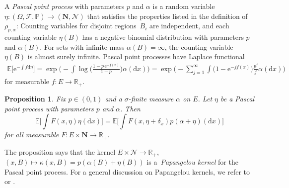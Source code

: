 \documentclass[pdftex]{sigma}
\numberwithin{equation}{section}
\newtheorem{Proposition}[Theorem]{Proposition}
 { \theoremstyle{definition}
\newtheorem{Definition}[Theorem]{Definition}
\newtheorem{Example}[Theorem]{Example}
\newtheorem{Remark}[Theorem]{Remark}
}
\newcommand{\e}{\mathrm{e}} %
\newcommand{\R}{\mathbb{R}}
\renewcommand{\P}{\mathbb{P}}
\newcommand{\E}{\mathbb{E}}
\newcommand{\dd}{\mathrm{d}} %
\newcommand{\1}{\mathbbm{1}}
\begin{document}
A \emph{Pascal point process} with parameters $p$ and $\alpha$ is a random variable $\eta\colon(\Omega,\mathcal F, \P)\to (\mathbf N,\mathcal N)$ that satisfies the properties listed in the definition of $\rho_{p,\alpha}$: Counting variables for disjoint regions~$B_i$ are independent, and each counting variable $\eta(B)$ has a negative binomial distribution with parameters $p$ and $\alpha(B)$. For sets with infinite mass $\alpha(B) = \infty$, the counting variable $\eta(B)$ is almost surely infinite. Pascal point processes have Laplace functional
\begin{gather*}
	\E\bigl[ \e^{-\int f\dd \eta}\bigr] = \exp \biggl(\! - \int \log \biggl(\frac{1- p\,\e^{-f(x)}}{1- p}\biggr) \alpha (\dd x)\biggr) = 	\exp\Biggl(\! - \sum_{j=1}^\infty \int \bigl(1- \e^{- j f(x)}\bigr) \frac{p^j}{j} \alpha(\dd x) \Biggr)
\end{gather*}
for measurable $f \colon E \to \R_+$.

\begin{Proposition}%
	Fix $p\in (0,1)$ and a $\sigma$-finite measure $\alpha$ on $E$. Let $\eta$ be a Pascal point process with parameters $p$ and $\alpha$. Then
	\[
		\E\biggl[ \int F(x,\eta)\eta(\dd x)\biggr] = \E\biggl[\int F(x,\eta+\delta_x) p (\alpha+\eta)(\dd x)\biggr]
	\]
	for all measurable $F\colon E\times \mathbf N \to \R_+$.
\end{Proposition}

The proposition says that the kernel $E\times \mathcal N\to \R_+$, $(x,B)\mapsto \kappa(x,B) = p(\alpha(B) + \eta(B))$ is a~\emph{Papangelou kernel} for the Pascal point process. For a general discussion on Papangelou kernels, we refer to \cite{MatthesWarmuthMecke} or \cite[Section 1.2.2]{Rafler2009}.
\end{document}
